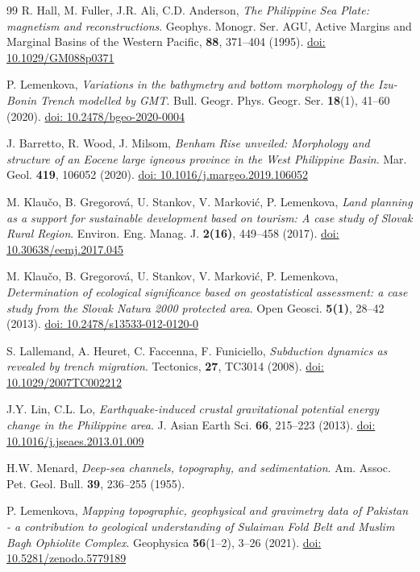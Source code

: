\documentclass{rrparticle}
\begin{document}
\begin{thebibliography}{99}
 R. Hall, M. Fuller, J.R. Ali, C.D. Anderson, \emph{The Philippine Sea Plate: magnetism and reconstructions}. Geophys. Monogr. Ser. AGU, Active Margins and Marginal Basins of the Western Pacific, \textbf{88}, 371--404 (1995). \href{https://doi.org/10.1029/GM088p0371}{doi: 10.1029/GM088p0371}

 P. Lemenkova, \emph{Variations in the bathymetry and bottom morphology of the Izu-Bonin Trench modelled by GMT}. Bull. Geogr. Phys. Geogr. Ser. \textbf{18}(1), 41--60 (2020). \href{https://doi.org/10.2478/bgeo-2020-0004}{doi: 10.2478/bgeo-2020-0004}

 J. Barretto, R. Wood, J. Milsom, \emph{Benham Rise unveiled: Morphology and structure of an Eocene large igneous province in the West Philippine Basin}. Mar. Geol. \textbf {419}, 106052 (2020). \href{https://doi.org/10.1016/j.margeo.2019.106052}{doi: 10.1016/j.margeo.2019.106052}

 M. Klaučo, B. Gregorová, U. Stankov, V. Marković, P. Lemenkova, \emph{Land planning as a support for sustainable development based on tourism: A case study of Slovak Rural Region}. Environ. Eng. Manag. J. \textbf{2(16)}, 449--458 (2017). \href{https://doi.org/10.30638/eemj.2017.045}{doi: 10.30638/eemj.2017.045} 

 M. Klaučo, B. Gregorová, U. Stankov, V. Marković, P. Lemenkova, \emph{Determination of ecological significance based on geostatistical assessment: a case study from the Slovak Natura 2000 protected area}. Open Geosci. \textbf{5(1)}, 28--42 (2013). \href{https://doi.org/10.2478/s13533-012-0120-0}{doi: 10.2478/s13533-012-0120-0}

S. Lallemand, A. Heuret, C. Faccenna, F. Funiciello, \emph{Subduction dynamics as revealed by trench migration}. Tectonics, \textbf{27}, TC3014 (2008). \href{https://doi.org/10.1029/2007TC002212}{doi: 10.1029/2007TC002212}

 J.Y. Lin, C.L. Lo, \emph{Earthquake-induced crustal gravitational potential energy change in the Philippine area}. J. Asian Earth Sci. \textbf{66}, 215--223 (2013). \href{https://doi.org/10.1016/j.jseaes.2013.01.009}{doi: 10.1016/j.jseaes.2013.01.009}

 H.W. Menard, \emph{Deep-sea channels, topography, and sedimentation}. Am. Assoc. Pet. Geol. Bull. \textbf{39}, 236--255 (1955).

P. Lemenkova, \emph{Mapping topographic, geophysical and gravimetry data of Pakistan - a contribution to geological understanding of Sulaiman Fold Belt and Muslim Bagh Ophiolite Complex}. Geophysica \textbf{56}(1--2), 3--26 (2021). \href{https://doi.org/10.5281/zenodo.5779189}{doi: 10.5281/zenodo.5779189}


\end{thebibliography}
\end{document}
